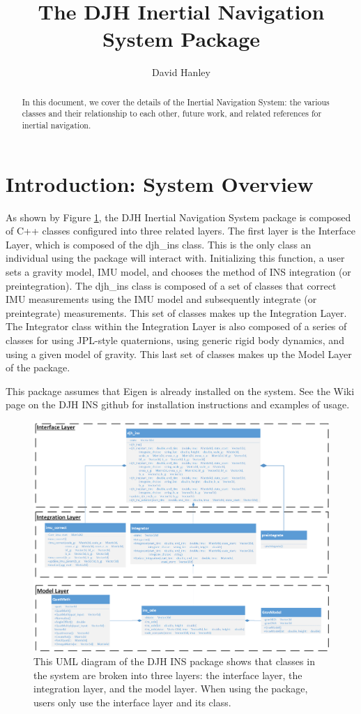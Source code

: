 \documentclass[11pt,a4paper]{article}
\title{The DJH Inertial Navigation System Package}
\author{David Hanley}
\begin{document}
\maketitle

\begin{abstract}
In this document, we cover the details of the Inertial Navigation System: the various classes and their relationship to each other, future work, and related references for inertial navigation.
\end{abstract}

\section{Introduction: System Overview}

As shown by Figure \ref{fig:UML}, the DJH Inertial Navigation System package is composed of C++ classes configured into three related layers. The first layer is the Interface Layer, which is composed of the djh\_ins class. This is the only class an individual using the package will interact with. Initializing this function, a user sets a gravity model, IMU model, and chooses the method of INS integration (or preintegration). The djh\_ins class is composed of a set of classes that correct IMU measurements using the IMU model and subsequently integrate (or preintegrate) measurements. This set of classes makes up the Integration Layer. The Integrator class within the Integration Layer is also composed of a series of classes for using JPL-style quaternions, using generic rigid body dynamics, and using a given model of gravity. This last set of classes makes up the Model Layer of the package.

This package assumes that Eigen is already installed on the system. See the Wiki page on the DJH INS github for installation instructions and examples of usage.

\begin{figure}[htp]
	\centering
	\includegraphics[scale=0.4]{pictures/UMLofdjh_ins}
	\caption{This UML diagram of the DJH INS package shows that classes in the system are broken into three layers: the interface layer, the integration layer, and the model layer. When using the package, users only use the interface layer and its class.}
	\label{fig:UML}
\end{figure}
\end{document}
